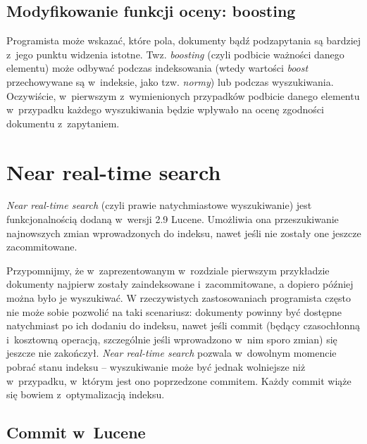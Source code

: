 \subsection{Modyfikowanie funkcji oceny: boosting}
\label{sec:boosting}

Programista może wskazać, które pola, dokumenty bądź podzapytania są bardziej z~jego punktu widzenia istotne. Twz. \emph{boosting} (czyli podbicie ważności danego elementu) może odbywać podczas indeksowania (wtedy wartości \emph{boost} przechowywane są w~indeksie, jako tzw. \emph{normy}) lub podczas wyszukiwania. Oczywiście, w~pierwszym z~wymienionych przypadków podbicie danego elementu w~przypadku każdego wyszukiwania będzie wpływało na ocenę zgodności dokumentu z~zapytaniem.

\section{Near real-time search}

\emph{Near real-time search} (czyli prawie natychmiastowe wyszukiwanie) jest funkcjonalnością dodaną w~wersji 2.9 Lucene. Umożliwia ona przeszukiwanie najnowszych zmian wprowadzonych do indeksu, nawet jeśli nie zostały one jeszcze zacommitowane. 

Przypomnijmy, że w~zaprezentowanym w~rozdziale pierwszym przykładzie dokumenty najpierw zostały zaindeksowane i~zacommitowane, a dopiero później można było je wyszukiwać. W rzeczywistych zastosowaniach programista często nie może sobie pozwolić na taki scenariusz: dokumenty powinny być dostępne natychmiast po ich dodaniu do indeksu, nawet jeśli commit (będący czasochłonną i~kosztowną operacją, szczególnie jeśli wprowadzono w~nim sporo zmian) się jeszcze nie zakończył. \emph{Near real-time search} pozwala w~dowolnym momencie pobrać stanu indeksu -- wyszukiwanie może być jednak wolniejsze niż w~przypadku, w~którym jest ono poprzedzone commitem. Każdy commit wiąże się bowiem z~optymalizacją indeksu.

\subsection{Commit w~Lucene}

